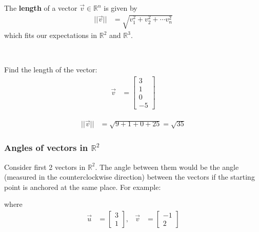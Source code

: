 \begin{definition}
The \textbf{length} of a vector  $\vec{v} \in \mathbb{R}^n$ is given by
%
\begin{align*}
|| \vec{v}|| & = \sqrt{v_1^2 + v_2^2 + \cdots v_n^2 }
\end{align*}
which fits our expectations in $\mathbb{R}^2$ and $\mathbb{R}^3$.
\end{definition}

\phantom{some text that doesn't show.}

~

\begin{example}
Find the length of the vector:
%
\begin{align*}
\vec{v}& = \begin{bmatrix}
3 \\ 1 \\ 0 \\ -5
\end{bmatrix}
\end{align*}

\solution

\begin{align*}
||\vec{v}|| & = \sqrt{9+1+0+25} = \sqrt{35}
\end{align*}
\end{example}

\subsubsection{Angles of vectors in $\mathbb{R}^2$}

Consider first 2 vectors in $\mathbb{R}^2$.  The angle between them would be the angle (measured in the counterclockwise direction) between the vectors if the starting point is anchored at the same place.   For example:


\begin{center}
\end{center}
where
%
\begin{align*}
\vec{u} & = \begin{bmatrix}
3 \\ 1
\end{bmatrix}, & \vec{v} & = \begin{bmatrix}
-1 \\ 2
\end{bmatrix}
\end{align*}

